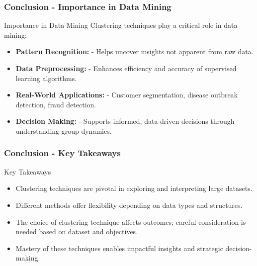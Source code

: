 \documentclass[aspectratio=169]{beamer}
\begin{document}
\begin{frame}[fragile]
    \frametitle{Conclusion - Importance in Data Mining}
    \begin{block}{Importance in Data Mining}
        Clustering techniques play a critical role in data mining:
    \end{block}
    
    \begin{itemize}
        \item \textbf{Pattern Recognition:} 
            - Helps uncover insights not apparent from raw data.
        \item \textbf{Data Preprocessing:}
            - Enhances efficiency and accuracy of supervised learning algorithms.
        \item \textbf{Real-World Applications:}
            - Customer segmentation, disease outbreak detection, fraud detection.
        \item \textbf{Decision Making:}
            - Supports informed, data-driven decisions through understanding group dynamics.
    \end{itemize}
\end{frame}

\begin{frame}[fragile]
    \frametitle{Conclusion - Key Takeaways}
    \begin{block}{Key Takeaways}
        \begin{itemize}
            \item Clustering techniques are pivotal in exploring and interpreting large datasets.
            \item Different methods offer flexibility depending on data types and structures.
            \item The choice of clustering technique affects outcomes; careful consideration is needed based on dataset and objectives.
            \item Mastery of these techniques enables impactful insights and strategic decision-making.
        \end{itemize}
    \end{block}
\end{frame}
\end{document}

